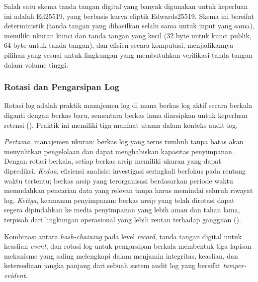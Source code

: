 Salah satu skema tanda tangan digital yang banyak digunakan untuk
keperluan ini adalah Ed25519, yang berbasis kurva eliptik
Edwards25519. Skema ini bersifat deterministik (tanda tangan yang
dihasilkan selalu sama untuk input yang sama), memiliki ukuran kunci
dan tanda tangan yang kecil (32 byte untuk kunci publik, 64 byte
untuk tanda tangan), dan efisien secara komputasi, menjadikannya
pilihan yang sesuai untuk lingkungan yang membutuhkan verifikasi
tanda tangan dalam volume tinggi.

\subsubsection{Rotasi dan Pengarsipan Log}

Rotasi log adalah praktik manajemen log di mana berkas log aktif
secara berkala diganti dengan berkas baru, sementara berkas lama
diarsipkan untuk keperluan retensi (\cite{nist80092}). Praktik ini
memiliki tiga manfaat utama dalam konteks audit log.

\textit{Pertama}, manajemen ukuran: berkas log yang terus tumbuh
tanpa batas akan menyulitkan pengelolaan dan dapat menghabiskan
kapasitas penyimpanan. Dengan rotasi berkala, setiap berkas arsip
memiliki ukuran yang dapat diprediksi. \textit{Kedua}, efisiensi
analisis: investigasi seringkali berfokus pada rentang waktu
tertentu; berkas arsip yang terorganisasi berdasarkan periode waktu
memudahkan pencarian data yang relevan tanpa harus memindai seluruh
riwayat log. \textit{Ketiga}, keamanan penyimpanan: berkas arsip yang
telah dirotasi dapat segera dipindahkan ke media penyimpanan yang
lebih aman dan tahan lama, terpisah dari lingkungan operasional yang
lebih rentan terhadap gangguan (\cite{nist80092}).

Kombinasi antara \textit{hash-chaining} pada level \textit{record},
tanda tangan digital untuk keaslian \textit{event}, dan rotasi log
untuk pengarsipan berkala membentuk tiga lapisan mekanisme yang saling
melengkapi dalam menjamin integritas, keaslian, dan ketersediaan
jangka panjang dari sebuah sistem audit log yang bersifat
\textit{tamper-evident}.